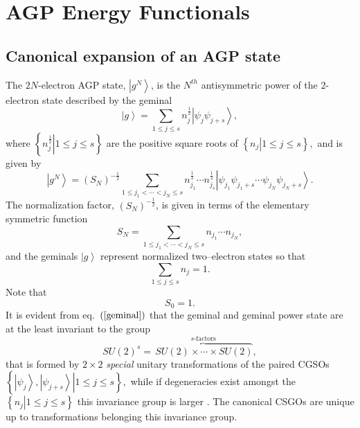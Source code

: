 \documentclass[aps,preprint]{revtex4}%
\begin{document}
\section{AGP Energy Functionals\label{AGP}}

\subsection{Canonical expansion of an AGP state}

\bigskip The $2N$-electron AGP state, $\left\vert g^{N}\right\rangle $, is the
$N^{th}$ antisymmetric power of the $2$-electron state described by the
geminal
\begin{equation}
\left\vert g\right\rangle =\sum_{1\leq j\leq s}n_{j}^{\frac{1}{2}}\left\vert
\psi_{j}\psi_{j+s}\right\rangle , \label{geminal}%
\end{equation}
where $\left\{  \left.  n_{j}^{\frac{1}{2}}\right\vert 1\leq j\leq s\right\}
$ are the positive square roots of $\left\{  \left.  n_{j}\right\vert 1\leq
j\leq s\right\}  ,$ and is given by \cite{Weiner&ortiz04}
\begin{equation}
\left\vert g^{N}\right\rangle =\left(  S_{N}\right)  ^{-\frac{1}{2}}%
\sum_{1\leq j_{1}<\cdots<j_{N}\leq s}n_{j_{1}}^{\frac{1}{2}}\cdots n_{j_{s}%
}^{\frac{1}{2}}\left\vert \psi_{j_{1}}\psi_{j_{1}+s}\cdots\psi_{j_{N}}%
\psi_{j_{N}+s}\right\rangle . \label{agp}%
\end{equation}
The normalization factor, $\left(  S_{N}\right)  ^{-\frac{1}{2}}$, is given in
terms of the elementary symmetric function
\begin{equation}
S_{N}=\sum_{1\leq j_{1}<\cdots<j_{N}\leq s}n_{j_{1}}\cdots n_{j_{N}},
\end{equation}
and the geminals $\left\vert g\right\rangle $ represent normalized
two--electron states so that
\begin{equation}
\sum_{1\leq j\leq s}n_{j}=1.
\end{equation}
Note that
\begin{equation}
S_{0}=1.
\end{equation}
It is evident from eq.\ $\left(  \ref{geminal}\right)  $ that the geminal and
geminal power state are at the least invariant to the group
\begin{equation}
SU\left(  2\right)  ^{s}=\overset{s\text{-factors}}{\overbrace{\,SU\left(
2\right)  \times\cdots\times SU\left(  2\right)  }},
\end{equation}
that is formed by $2\times2$ \emph{special} unitary transformations of the
paired CGSOs $\left\{  \left.  \left\vert \psi_{j}\right\rangle ,\left\vert
\psi_{j+s}\right\rangle \right\vert 1\leq j\leq s\right\}  ,$ while if
degeneracies exist amongst the $\left\{  \left.  n_{j}\right\vert 1\leq j\leq
s\right\}  $ this invariance group is larger \cite{AGPCoherent}. The canonical
CSGOs are unique up to transformations belonging this invariance group.
\end{document}
